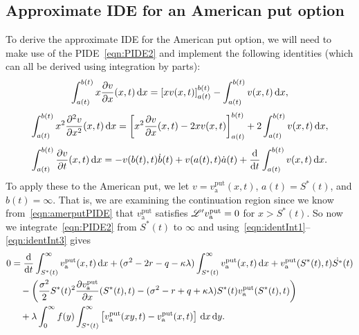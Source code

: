         	\subsection{Approximate IDE for an American put option}
        	
        	To derive the approximate IDE for the American put option, we will need to make use of the PIDE~\eqref{eqn:PIDE2} and implement the following identities (which can all be derived using integration by parts):
        	\begin{equation}
        		\label{eqn:identInt1}
        		\int_{a(t)}^{b(t)} x\frac{\partial v}{\partial x}(x,t) \, \mathrm d x = [xv(x,t)]_{a(t)}^{b(t)} - \int_{a(t)}^{b(t)} v(x,t) \, \mathrm d x,
        	\end{equation}
        	\begin{equation}
        		\label{eqn:identInt2}
        		\int_{a(t)}^{b(t)} x^2\frac{\partial^2 v}{\partial x^2}(x,t) \, \mathrm d x = \left[x^2 \frac{\partial v}{\partial x}(x,t) - 2xv(x,t)\right]_{a(t)}^{b(t)} + 2\int_{a(t)}^{b(t)} v(x,t) \, \mathrm d x,
        	\end{equation}
        	\begin{equation}
        		\label{eqn:identInt3}
        		\int_{a(t)}^{b(t)} \frac{\partial v}{\partial t}(x,t) \, \mathrm d x = -v(b(t),t)\dot b(t) + v(a(t),t)\dot a(t) + \frac{\mathrm d}{\mathrm d t} \int_{a(t)}^{b(t)} v(x,t) \, \mathrm d x.
        	\end{equation}
        	To apply these to the American put, we let $v = v_{\text{a}}^{\text{put}}(x,t)$, $a(t) = S^*(t)$, and $b(t) = \infty$. That is, we are examining the continuation region since we know from~\eqref{eqn:amerputPIDE} that $v_{\text{a}}^{\text{put}}$ satisfies $\mathscr L'v_{\text{a}}^{\text{put}} = 0$ for $x > S^*(t)$. So now we integrate~\eqref{eqn:PIDE2} from $S^*(t)$ to $\infty$ and using~\eqref{eqn:identInt1}--\eqref{eqn:identInt3} gives
        	\begin{equation}
        		\label{eqn:longeqn1}
        		\begin{split}
        		0 &= \frac{\mathrm d}{\mathrm d t}\int_{S^*(t)}^\infty v_{\text{a}}^{\text{put}}(x,t) \, \mathrm d x + (\sigma^2 - 2r - q -\kappa\lambda)\int_{S^*(t)}^\infty v_{\text{a}}^{\text{put}}(x,t) \, \mathrm d x + v_{\text{a}}^{\text{put}}(S^*(t),t)\dot{S^*}(t) \\
        		&\quad{} -\left( \frac{\sigma^2}{2}S^*(t)^2\frac{\partial v_{\text{a}}^{\text{put}}}{\partial x}(S^*(t),t) - (\sigma^2 - r + q + \kappa\lambda)S^*(t)v_{\text{a}}^{\text{put}}(S^*(t),t) \right) \\
        		&\quad{} +\lambda\int_0^\infty f(y) \int_{S^*(t)}^\infty \left[v_{\text{a}}^{\text{put}}(xy,t) - v_{\text{a}}^{\text{put}}(x,t)\right] \, \mathrm d x \, \mathrm d y.
        		\end{split}
        	\end{equation}
